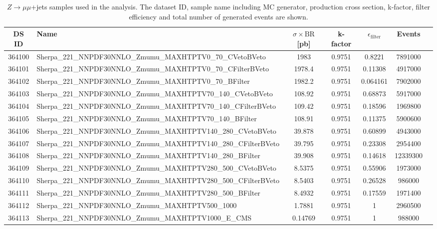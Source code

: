 \begin{landscape}
\begin{table}[!htb]
\caption[$Z \to \mu\mu +$ jets Monte Carlo samples for background estimation]{$Z \to \mu\mu$+jets samples used in the analysis. The dataset ID, sample name including MC generator, production cross section, k-factor, filter efficiency and total number of generated events are shown.}
\label{tabular:mc_samples_Zmumujets}
\begin{footnotesize}
\begin{center}
\begin{tabular}{c|l|c|c|c|cr}
	\hline\hline
	DS ID & Name & $\sigma\times\text{BR}$ [pb] & k-factor & $\epsilon_{\text{filter}}$ & Events \\ \hline\hline
364100 & Sherpa\_221\_NNPDF30NNLO\_Zmumu\_MAXHTPTV0\_70\_CVetoBVeto & 1983 & 0.9751 & 0.8221 & 7891000 \\
364101 & Sherpa\_221\_NNPDF30NNLO\_Zmumu\_MAXHTPTV0\_70\_CFilterBVeto & 1978.4 & 0.9751 & 0.11308 & 4917000 \\
364102 & Sherpa\_221\_NNPDF30NNLO\_Zmumu\_MAXHTPTV0\_70\_BFilter & 1982.2 & 0.9751 & 0.064161 & 7902000 \\
364103 & Sherpa\_221\_NNPDF30NNLO\_Zmumu\_MAXHTPTV70\_140\_CVetoBVeto & 108.92 & 0.9751 & 0.68873 & 5917000 \\
364104 & Sherpa\_221\_NNPDF30NNLO\_Zmumu\_MAXHTPTV70\_140\_CFilterBVeto & 109.42 & 0.9751 & 0.18596 & 1969800 \\
364105 & Sherpa\_221\_NNPDF30NNLO\_Zmumu\_MAXHTPTV70\_140\_BFilter & 108.91 & 0.9751 & 0.11375 & 5900600 \\
364106 & Sherpa\_221\_NNPDF30NNLO\_Zmumu\_MAXHTPTV140\_280\_CVetoBVeto & 39.878 & 0.9751 & 0.60899 & 4943000 \\
364107 & Sherpa\_221\_NNPDF30NNLO\_Zmumu\_MAXHTPTV140\_280\_CFilterBVeto & 39.795 & 0.9751 & 0.23308 & 2954400 \\
364108 & Sherpa\_221\_NNPDF30NNLO\_Zmumu\_MAXHTPTV140\_280\_BFilter & 39.908 & 0.9751 & 0.14618 & 12339300 \\
364109 & Sherpa\_221\_NNPDF30NNLO\_Zmumu\_MAXHTPTV280\_500\_CVetoBVeto & 8.5375 & 0.9751 & 0.55906 & 1973000 \\
364110 & Sherpa\_221\_NNPDF30NNLO\_Zmumu\_MAXHTPTV280\_500\_CFilterBVeto & 8.5403 & 0.9751 & 0.26528 & 986000 \\
364111 & Sherpa\_221\_NNPDF30NNLO\_Zmumu\_MAXHTPTV280\_500\_BFilter & 8.4932 & 0.9751 & 0.17559 & 1971400 \\
364112 & Sherpa\_221\_NNPDF30NNLO\_Zmumu\_MAXHTPTV500\_1000 & 1.7881 & 0.9751 & 1 & 2960500 \\
364113 & Sherpa\_221\_NNPDF30NNLO\_Zmumu\_MAXHTPTV1000\_E\_CMS & 0.14769 & 0.9751 & 1 & 988000 \\
	\hline\hline
\end{tabular}
\end{center}
\end{footnotesize}
\end{table}


\end{landscape}
